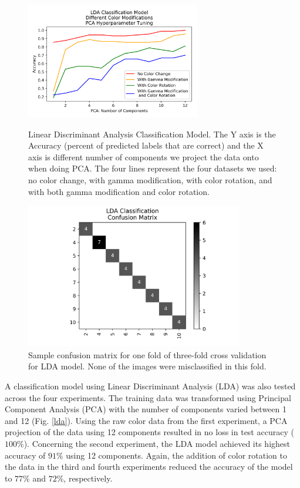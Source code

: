 \documentclass[journal]{IEEEtran}
\begin{document}
\begin{figure}
\centering
\includegraphics[height=2in]{LDA/lda_classification.png}
\caption{Linear Discriminant Analysis Classification Model. The Y axis is the Accuracy (percent of predicted labels that are correct) and the X axis is different number of components we project the data onto when doing PCA. The four lines represent the four datasets we used: no color change, with gamma modification, with color rotation, and with both gamma modification and color rotation.}
\label{lda}

\centering
\includegraphics[height=2.5in]{LDA/LDA_classification_cfm.png}
\caption{Sample confusion matrix for one fold of three-fold cross validation for LDA model. None of the images were misclassified in this fold.}
\label{lda_confusion}
\end{figure}

A classification model using Linear Discriminant Analysis (LDA) was also tested across the four experiments. The training data was transformed using Principal Component Analysis (PCA) with the number of components varied between 1 and 12 (Fig. \ref{lda}). Using the raw color data from the first experiment, a PCA projection of the data using 12 components resulted in no loss in test accuracy ($100\%$). Concerning the second experiment, the LDA model achieved its highest accuracy of $91\%$ using 12 components. Again, the addition of color rotation to the data in the third and fourth experiments reduced the accuracy of the model to $77\%$ and $72\%$, respectively.
\end{document}
